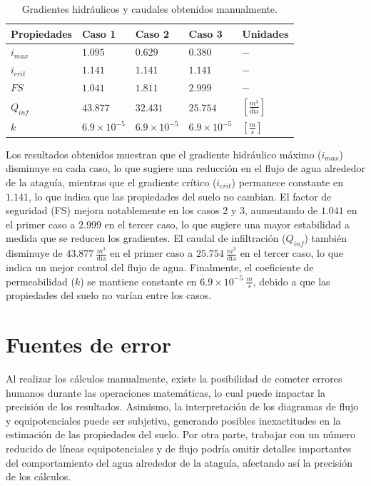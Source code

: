 \begin{table}[H]
    \begin{center}
        \caption{Gradientes hidráulicos y caudales obtenidos manualmente.}
        \begin{tabularx}{0.75\textwidth}{>{\centering\arraybackslash}X >{\centering\arraybackslash}X >{\centering\arraybackslash}X >{\centering\arraybackslash}X >{\centering\arraybackslash}X}
        \hline
        \textbf{Propiedades} & \textbf{Caso 1} & \textbf{Caso 2} & \textbf{Caso 3} & \textbf{Unidades} \\
        \hline
        $i_{max}$ & $1.095$ & $0.629$ & $0.380$ & $-$ \\
        $i_{crit}$ & $1.141$ & $1.141$ & $1.141$ & $-$ \\
        $FS$ & $1.041$ & $1.811$ & $2.999$ & $-$\\
        $Q_{inf}$ & $43.877$ & $32.431$ & $25.754$ & $[\frac{m^3}{\text{día}}]$\\
        $k$ & $6.9 \times 10^{-5}$ & $6.9 \times 10^{-5}$ & $6.9 \times 10^{-5}$ & $[\frac{m}{s}]$\\
        \hline
        \end{tabularx}
        \label{tab:Manuales1}
    \end{center}
\end{table}

Los resultados obtenidos muestran que el gradiente hidráulico máximo ($i_{max}$) disminuye en cada caso, lo que sugiere una reducción en el flujo de agua alrededor de la ataguía, mientras que el gradiente crítico ($i_{crit}$) permanece constante en $1.141$, lo que indica que las propiedades del suelo no cambian. El factor de seguridad (FS) mejora notablemente en los casos 2 y 3, aumentando de $1.041$ en el primer caso a $2.999$ en el tercer caso, lo que sugiere una mayor estabilidad a medida que se reducen los gradientes. El caudal de infiltración ($Q_{inf}$) también disminuye de $43.877 \ \frac{m^3}{\text{día}}$ en el primer caso a $25.754 \ \frac{m^3}{\text{día}}$ en el tercer caso, lo que indica un mejor control del flujo de agua. Finalmente, el coeficiente de permeabilidad ($k$) se mantiene constante en $6.9 \times 10^{-5} \ \frac{m}{s}$, debido a que las propiedades del suelo no varían entre los casos.

\section{Fuentes de error}

Al realizar los cálculos manualmente, existe la posibilidad de cometer errores humanos durante las operaciones matemáticas, lo cual puede impactar la precisión de los resultados. Asimismo, la interpretación de los diagramas de flujo y equipotenciales puede ser subjetiva, generando posibles inexactitudes en la estimación de las propiedades del suelo. Por otra parte, trabajar con un número reducido de líneas equipotenciales y de flujo podría omitir detalles importantes del comportamiento del agua alrededor de la ataguía, afectando así la precisión de los cálculos.

